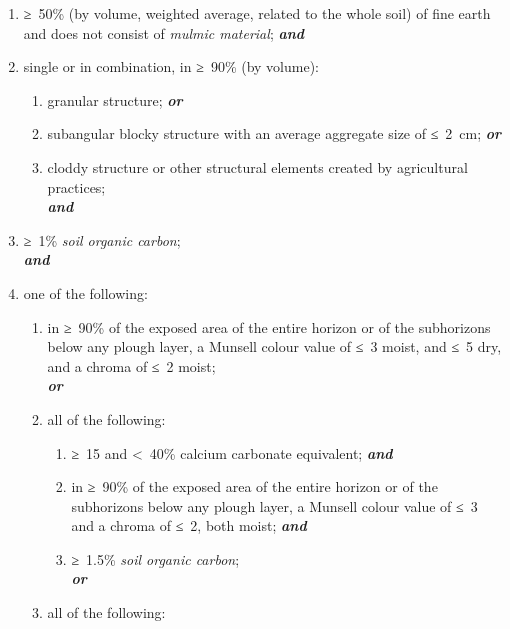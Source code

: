 \documentclass[
  letterpaper,
  DIV=11,
  numbers=noendperiod]{scrreprt}
\providecommand{\tightlist}{%
  \setlength{\itemsep}{0pt}\setlength{\parskip}{0pt}}\usepackage{longtable,booktabs,array}
\begin{document}
\begin{enumerate}
\def\labelenumi{\arabic{enumi}.}
\item
  ≥~50\% (by volume, weighted average, related to the whole soil) of
  fine earth and does not consist of \emph{mulmic material};
  \textbf{\emph{and}}
\item
  single or in combination, in ≥~90\% (by volume):

  \begin{enumerate}
  \def\labelenumii{\alph{enumii}.}
  \tightlist
  \item
    granular structure; \textbf{\emph{or}}
  \item
    subangular blocky structure with an average aggregate size of
    ≤~2~cm; \textbf{\emph{or}}
  \item
    cloddy structure or other structural elements created by
    agricultural practices;\\
    \textbf{\emph{and}}
  \end{enumerate}
\item
  ≥~1\% \emph{soil organic carbon};\\
  \textbf{\emph{and}}
\item
  one of the following:

  \begin{enumerate}
  \def\labelenumii{\alph{enumii}.}
  \tightlist
  \item
    in ≥~90\% of the exposed area of the entire horizon or of the
    subhorizons below any plough layer, a Munsell colour value of ≤~3
    moist, and ≤~5 dry, and a chroma of ≤~2 moist;\\
    \textbf{\emph{or}}
  \item
    all of the following:

    \begin{enumerate}
    \def\labelenumiii{\roman{enumiii}.}
    \tightlist
    \item
      ≥~15 and \textless~40\% calcium carbonate equivalent;
      \textbf{\emph{and}}
    \item
      in ≥~90\% of the exposed area of the entire horizon or of the
      subhorizons below any plough layer, a Munsell colour value of ≤~3
      and a chroma of ≤~2, both moist; \textbf{\emph{and}}
    \item
      ≥~1.5\% \emph{soil organic carbon};\\
      \textbf{\emph{or}}
    \end{enumerate}
  \item
    all of the following:


\end{enumerate}
\end{enumerate}
\end{document}
